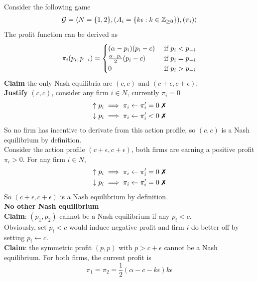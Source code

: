 \documentclass[11pt]{article}
\begin{document}
	\begin{example}
		Consider the following game
		\begin{gather}
			\mathcal{{G}} = \langle N=\{1,2\}, (A_i = \{k \epsilon: k \in \mathbb{Z}_{\geq 0}\}), (\pi_i) \rangle
		\end{gather}
		The profit function can be derived as
		\begin{gather}
			\pi_i(p_i, p_{-i}) = \begin{cases}
				(\alpha - p_i)(p_i - c)&\text{{ if }} p_i < p_{-i} \\
				\frac{\alpha - p_i}{2}(p_i - c) &\text{{ if }} p_i = p_{-i} \\
				0 &\text{{ if }} p_i > p_{-i}
			\end{cases}
		\end{gather}
		\textbf{Claim} the only Nash equilibria are $(c, c)$ and $(c+\epsilon, c+\epsilon)$. \\
		\textbf{Justify} $(c, c)$, consider any firm $i \in N$, currently $\pi_i = 0$ 
		\begin{gather}
			\uparrow p_i \implies \pi_i \leftarrow \pi_i' = 0 \tx{ \xmark} \\
			\downarrow p_i \implies \pi_i \leftarrow \pi_i' < 0 \tx{ \xmark}
		\end{gather}
		So no firm has incentive to derivate from this action profile, so $(c, c)$ is a Nash equilibrium by definition. \\
		Consider the action profile $(c+\epsilon, c+\epsilon)$, both firms are earning a positive profit $\pi_i > 0$. For any firm $i \in N$,
		\begin{gather}
			\uparrow p_i \implies \pi_i \leftarrow \pi_i' = 0 \tx{ \xmark} \\
			\downarrow p_i \implies \pi_i \leftarrow \pi_i' = 0 \tx{ \xmark}
		\end{gather}
		So $(c+\epsilon, c+\epsilon)$ is a Nash equilibrium by definition. \\
		\textbf{No other Nash equilibrium} \\
		\textbf{Claim}: $(p_1, p_2)$ cannot be a Nash equilibrium if any $p_i < c$. \\
		Obviously, set $p_i < c$ would induce negative profit and firm $i$ do better off by setting $p_i \leftarrow c$. \\
		\textbf{Claim}: the symmetric profit $(p, p)$ with $p > c + \epsilon$ cannot be a Nash equilibrium. For both firms, the current profit is
		\begin{equation}
			\pi_1 = \pi_2 = \frac{1}{2}(\alpha - c - k\epsilon) k \epsilon

\end{equation}
\end{example}
\end{document}
